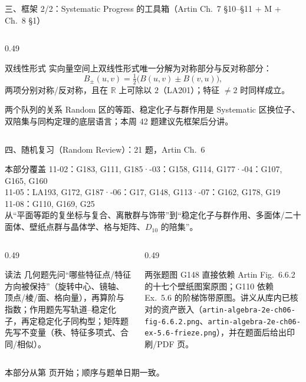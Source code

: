 \documentclass[aspectratio=169,10pt,fontset=none]{ctexbeamer}
\begin{document}
\begin{frame}[t]{三、框架 2/2：Systematic Progress 的工具箱（Artin Ch.~7 \S10--\S11 + M + Ch.~8 \S1）}
\begin{columns}[T,onlytextwidth]
\begin{column}{0.49\textwidth}
      \begin{block}{\footnotesize 双线性形式}
        \scriptsize
        实向量空间上双线性形式唯一分解为对称部分与反对称部分：
        \[ B_\pm(u,v)=\tfrac12\bigl(B(u,v)\pm B(v,u)\bigr), \]
        两项分别对称/反对称，且在 $\mathbb R$ 上可除以 $2$（LA201）；特征 $\ne2$ 时同样成立。
      \end{block}
      \begin{exampleblock}{\footnotesize 两个队列的关系}
        \scriptsize
        Random 区的等距、稳定化子与群作用是 Systematic 区换位子、双陪集与同构定理的底层语言；本周 42 题建议先框架后分讲。
      \end{exampleblock}
    \end{column}
  \end{columns}
\end{frame}

\begin{frame}[t]{四、随机复习（Random Review）：21 题，Artin Ch.~6}
  \label{sec:random}
  \begin{block}{\footnotesize 本部分覆盖}
    \scriptsize
    11-02：G183, G111, G185\quad·-03：G158, G114, G177\quad·-04：G107, G165, G160\\
    11-05：LA193, G172, G187\quad·-06：G17, G148, G113\quad·-07：G162, G178, G19\\
    11-08：G110, G169, G25\\[2pt]
    从“平面等距的复坐标与复合、离散群与饰带”到“稳定化子与群作用、多面体/二十面体、壁纸点群与晶体学、格与矩阵、$D_{10}$ 的陪集”。
  \end{block}
  \begin{columns}[T,onlytextwidth]
    \begin{column}{0.49\textwidth}
      \begin{exampleblock}{\footnotesize 读法}
        \scriptsize
        几何题先问“哪些特征点/特征方向被保持”（旋转中心、镜轴、顶点/棱/面、格向量），再算阶与指数；作用题先写轨道–稳定化子，再定稳定化子同构型；矩阵题先写不变量（秩、特征多项式、合同/相似）。
      \end{exampleblock}
    \end{column}
    \begin{column}{0.49\textwidth}
      \begin{block}{\footnotesize 两张题图}
        \scriptsize
        G148 直接依赖 Artin Fig.~6.6.2 的十七个壁纸图案原图；G110 依赖 Ex.~5.6 的阶梯饰带原图。讲义从库内已核对的资产嵌入（\texttt{artin-algebra-2e-ch06-fig-6.6.2.png}、\texttt{artin-algebra-2e-ch06-ex-5.6-frieze.png}），并在题面后给出印刷/PDF 页。
      \end{block}
    \end{column}
  \end{columns}
  \vspace{0.2em}
  {\scriptsize\color{ink!70} 本部分从第 \pageref{ex:G183} 页开始；顺序与题单日期一致。}
\end{frame}
\end{document}
